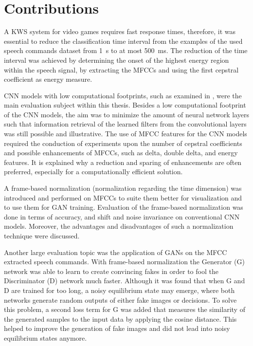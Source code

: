 
\section{Contributions}
A KWS system for video games requires fast response times, therefore, it was essential to reduce the classification time interval from the examples of the used speech commands dataset \cite{Warden2018} from \SI{1}{\second} to at most \SI{500}{\milli\second}.
The reduction of the time interval was achieved by determining the onset of the highest energy region within the speech signal, by extracting the MFCCs and using the first cepstral coefficient as energy measure.

CNN models with low computational footprints, such as examined in \cite{Sainath2015}, were the main evaluation subject within this thesis.
Besides a low computational footprint of the CNN models, the aim was to minimize the amount of neural network layers such that information retrieval of the learned filters from the convolutional layers was still possible and illustrative.
The use of MFCC features for the CNN models required the conduction of experiments upon the number of cepstral coefficients and possible enhancements of MFCCs, such as delta, double delta, and energy features.
It is explained why a reduction and sparing of enhancements are often preferred, especially for a computationally efficient solution.

A frame-based normalization (normalization regarding the time dimension) was introduced and performed on MFCCs to suite them better for visualization and to use them for GAN training.
Evaluation of the frame-based normalization was done in terms of accuracy, and shift and noise invariance on conventional CNN models.
Moreover, the advantages and disadvantages of such a normalization technique were discussed.

Another large evaluation topic was the application of GANs on the MFCC extracted speech commands. 
With frame-based normalization the Generator (G) network was able to learn to create convincing fakes in order to fool the Discriminator (D) network much faster.
Although it was found that when G and D are trained for too long, a noisy equilibrium state may emerge, where both networks generate random outputs of either fake images or decisions.
To solve this problem, a second loss term for G was added that measures the similarity of the generated samples to the input data by applying the cosine distance.
This helped to improve the generation of fake images and did not lead into noisy equilibrium states anymore.

